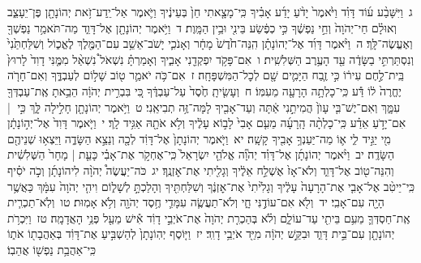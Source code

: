 \documentclass[18pt]{article}
\begin{document}
 {\loc ג~}וַיִּשָּׁבַ֨ע ע֜וֹד דָּוִ֗ד וַיֹּ֙אמֶר֙ יָדֹ֨עַ יָדַ֜ע אָבִ֗יךָ כִּֽי־מָצָ֤אתִי חֵן֙ בְּעֵינֶ֔יךָ וַיֹּ֛אמֶר אַל־יֵֽדַע־זֹ֥את יְהוֹנָתָ֖ן פֶּן־יֵעָצֵ֑ב וְאוּלָ֗ם חַי־יְהֹוָה֙ וְחֵ֣י נַפְשֶׁ֔ךָ כִּ֣י כְפֶ֔שַׂע בֵּינִ֖י וּבֵ֥ין הַמָּֽוֶת׃ \startlock
 {\loc ד~}וַיֹּ֥אמֶר יְהוֹנָתָ֖ן אֶל־דָּוִ֑ד מַה־תֹּאמַ֥ר נַפְשְׁךָ֖ וְאֶעֱשֶׂה־לָּֽךְ׃ \startlock
 {\loc ה~}וַיֹּ֨אמֶר דָּוִ֜ד אֶל־יְהוֹנָתָ֗ן הִֽנֵּה־חֹ֙דֶשׁ֙ מָחָ֔ר וְאָנֹכִ֛י יָשֹׁב־אֵשֵׁ֥ב עִם־הַמֶּ֖לֶךְ לֶאֱכ֑וֹל וְשִׁלַּחְתַּ֙נִי֙ וְנִסְתַּרְתִּ֣י בַשָּׂדֶ֔ה עַ֖ד הָעֶ֥רֶב הַשְּׁלִשִֽׁית׃ \startlock
 {\loc ו~}אִם־פָּקֹ֥ד יִפְקְדֵ֖נִי אָבִ֑יךָ וְאָמַרְתָּ֗ נִשְׁאֹל֩ נִשְׁאַ֨ל מִמֶּ֤נִּי דָוִד֙ לָרוּץ֙ בֵּֽית־לֶ֣חֶם עִיר֔וֹ כִּ֣י זֶ֧בַח הַיָּמִ֛ים שָׁ֖ם לְכׇל־הַמִּשְׁפָּחָֽה׃ \startlock
 {\loc ז~}אִם־כֹּ֥ה יֹאמַ֛ר ט֖וֹב שָׁל֣וֹם לְעַבְדֶּ֑ךָ וְאִם־חָרֹ֤ה יֶחֱרֶה֙ ל֔וֹ דַּ֕ע כִּֽי־כָלְתָ֥ה הָרָעָ֖ה מֵעִמּֽוֹ׃ \startlock
 {\loc ח~}וְעָשִׂ֤יתָֽ חֶ֙סֶד֙ עַל־עַבְדֶּ֔ךָ כִּ֚י בִּבְרִ֣ית יְהֹוָ֔ה הֵבֵ֥אתָ אֶֽת־עַבְדְּךָ֖ עִמָּ֑ךְ וְאִם־יֶשׁ־בִּ֤י עָוֺן֙ הֲמִיתֵ֣נִי אַ֔תָּה וְעַד־אָבִ֖יךָ לָמָּה־זֶּ֥ה תְבִיאֵֽנִי׃ \startlock
 {\loc ט~}וַיֹּ֥אמֶר יְהוֹנָתָ֖ן חָלִ֣ילָה לָּ֑ךְ כִּ֣י  |  אִם־יָדֹ֣עַ אֵדַ֗ע כִּֽי־כָלְתָ֨ה הָֽרָעָ֜ה מֵעִ֤ם אָבִי֙ לָב֣וֹא עָלֶ֔יךָ וְלֹ֥א אֹתָ֖הּ אַגִּ֥יד לָֽךְ׃ \startlock
 {\loc י~}וַיֹּ֤אמֶר דָּוִד֙ אֶל־יְה֣וֹנָתָ֔ן מִ֖י יַגִּ֣יד לִ֑י א֛וֹ מַה־יַּעַנְךָ֥ אָבִ֖יךָ קָשָֽׁה׃ \startlock
 {\loc יא~}וַיֹּ֤אמֶר יְהוֹנָתָן֙ אֶל־דָּוִ֔ד לְכָ֖ה וְנֵצֵ֣א הַשָּׂדֶ֑ה וַיֵּצְא֥וּ שְׁנֵיהֶ֖ם הַשָּׂדֶֽה׃ \startlock
 {\loc יב~}וַיֹּ֨אמֶר יְהוֹנָתָ֜ן אֶל־דָּוִ֗ד יְהֹוָ֞ה אֱלֹהֵ֤י יִשְׂרָאֵל֙ כִּֽי־אֶחְקֹ֣ר אֶת־אָבִ֗י כָּעֵ֤ת  |  מָחָר֙ הַשְּׁלִשִׁ֔ית וְהִנֵּה־ט֖וֹב אֶל־דָּוִ֑ד וְלֹא־אָז֙ אֶשְׁלַ֣ח אֵלֶ֔יךָ וְגָלִ֖יתִי אֶת־אׇזְנֶֽךָ׃ \startlock
 {\loc יג~}כֹּה־יַעֲשֶׂה֩ יְהֹוָ֨ה לִיהוֹנָתָ֜ן וְכֹ֣ה יֹסִ֗יף כִּֽי־יֵיטִ֨ב אֶל־אָבִ֤י אֶת־הָרָעָה֙ עָלֶ֔יךָ וְגָלִ֙יתִי֙ אֶת־אׇזְנֶ֔ךָ וְשִׁלַּחְתִּ֖יךָ וְהָלַכְתָּ֣ לְשָׁל֑וֹם וִיהִ֤י יְהֹוָה֙ עִמָּ֔ךְ כַּאֲשֶׁ֥ר הָיָ֖ה עִם־אָבִֽי׃ \startlock
 {\loc יד~}וְלֹ֖א אִם־עוֹדֶ֣נִּי חָ֑י וְלֹא־תַעֲשֶׂ֧ה עִמָּדִ֛י חֶ֥סֶד יְהֹוָ֖ה וְלֹ֥א אָמֽוּת׃ \startlock
 {\loc טו~}וְלֹֽא־תַכְרִ֧ית אֶֽת־חַסְדְּךָ֛ מֵעִ֥ם בֵּיתִ֖י עַד־עוֹלָ֑ם וְלֹ֗א בְּהַכְרִ֤ת יְהֹוָה֙ אֶת־אֹיְבֵ֣י דָוִ֔ד אִ֕ישׁ מֵעַ֖ל פְּנֵ֥י הָאֲדָמָֽה׃ \startlock
 {\loc טז~}וַיִּכְרֹ֥ת יְהוֹנָתָ֖ן עִם־בֵּ֣ית דָּוִ֑ד וּבִקֵּ֣שׁ יְהֹוָ֔ה מִיַּ֖ד אֹיְבֵ֥י דָוִֽד׃ \startlock
 {\loc יז~}וַיּ֤וֹסֶף יְהֽוֹנָתָן֙ לְהַשְׁבִּ֣יעַ אֶת־דָּוִ֔ד בְּאַהֲבָת֖וֹ אֹת֑וֹ כִּֽי־אַהֲבַ֥ת נַפְשׁ֖וֹ אֲהֵבֽוֹ׃ \startlock
\end{document}
